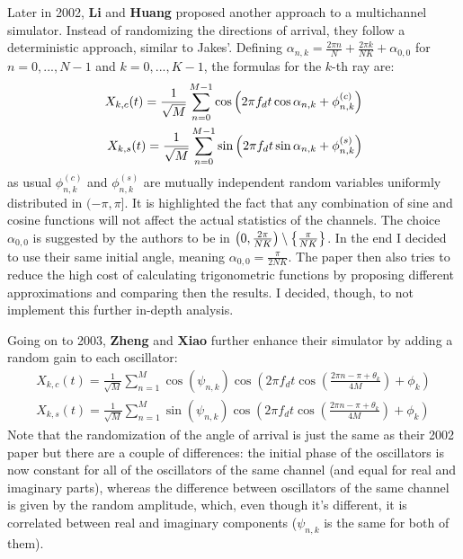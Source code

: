 Later in 2002, \textbf{Li} and \textbf{Huang} \cite{C1} proposed another approach to a multichannel simulator. Instead of randomizing the directions of arrival, they follow a deterministic approach, similar to Jakes'. Defining $\alpha_{n,k} = \frac{2\pi n}{N} + \frac{2 \pi k}{NK} + \alpha_{0,0}$ for $n = 0,...,N-1$ and $k=0,...,K-1$, the formulas for the $k$-th ray are:%
%
\begin{subequations}
\begin{align}
X_{k,c}(t) = \frac{1}{\sqrt{M}} \sum_{n=0}^{M-1} \cos \qty( 2\pi f_d t \cos \alpha_{n,k} + \phi_{n,k}^{(c)} )\\
X_{k,s}(t) = \frac{1}{\sqrt{M}} \sum_{n=0}^{M-1} \sin \qty( 2\pi f_d t \sin \alpha_{n,k} + \phi_{n,k}^{(s)} )
\end{align}
\end{subequations}%
%
as usual $\phi_{n,k}^{(c)}$ and $\phi_{n,k}^{(s)}$ are mutually independent random variables uniformly distributed in $(-\pi,\pi]$. It is highlighted the fact that any combination of sine and cosine functions will not affect the actual statistics of the channels. The choice $\alpha_{0,0}$ is suggested by the authors to be in $\qty(0,\frac{2\pi}{NK}) \setminus \qty{\frac{\pi}{NK}}$. In the end I decided to use their same initial angle, meaning $\alpha_{0,0} = \frac{\pi}{2NK}$. The paper then also tries to reduce the high cost of calculating trigonometric functions by proposing different approximations and comparing then the results. I decided, though, to not implement this further in-depth analysis.

Going on to 2003, \textbf{Zheng} and \textbf{Xiao} \cite{A2} further enhance their simulator by adding a random gain to each oscillator:%
%
\begin{subequations}
\begin{align}
X_{k,c}(t) = \frac{1}{\sqrt{M}} \sum_{n=1}^{M} \cos(\psi_{n,k})\cos \left( 2\pi f_d t \cos \left( \frac{2\pi n - \pi + \theta_k}{4M}\right) + \phi_k \right)\\
X_{k,s}(t) = \frac{1}{\sqrt{M}} \sum_{n=1}^{M} \sin(\psi_{n,k})\cos \left( 2\pi f_d t \cos \left( \frac{2\pi n - \pi + \theta_k}{4M}\right) + \phi_k \right)
\end{align}
\end{subequations}%
%
Note that the randomization of the angle of arrival is just the same as their 2002 paper but there are a couple of differences: the initial phase of the oscillators is now constant for all of the oscillators of the same channel (and equal for real and imaginary parts), whereas the difference between oscillators of the same channel is given by the random amplitude, which, even though it's different, it is correlated between real and imaginary components ($\psi_{n,k}$ is the same for both of them).